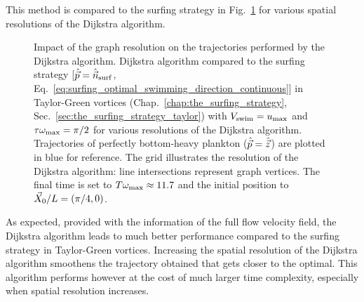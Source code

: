 This method is compared to the surfing strategy in Fig.~\ref{fig:taylor_green_vortex_dijkstra} for various spatial resolutions of the Dijkstra algorithm.
\begin{figure}%
	\centering
	
	\caption[Impact of the graph resolution on the trajectories performed by the Dijkstra algorithm.]{
		Impact of the graph resolution on the trajectories performed by the Dijkstra algorithm.
		Dijkstra algorithm compared to the surfing strategy [$\hat{\vec{p}} = \hat{\vec{n}}_{\mathrm{surf}}$, Eq.~\eqref{eq:surfing_optimal_swimming_direction_continuous}] in Taylor-Green vortices (Chap.~\ref{chap:the_surfing_strategy}, Sec.~\ref{sec:the_surfing_strategy_taylor}) with $V_{\mathrm{swim}} = u_{\max}$ and $\tau \omega_{\max} = \pi/2$ for various resolutions of the Dijkstra algorithm.
		Trajectories of perfectly bottom-heavy plankton ($\hat{\vec{p}} = \hat{\vec{z}}$) are plotted in blue for reference.
		The grid illustrates the resolution of the Dijkstra algorithm: line intersections represent graph vertices.
		The  final time is set to $T \omega_{\max} \approx 11.7$ and the initial position to $\vec{X}_0/L = (\pi/4, 0)$.
	}
	\label{fig:taylor_green_vortex_dijkstra}
\end{figure}
As expected, provided with the information of the full flow velocity field, the Dijkstra algorithm leads to much better performance compared to the surfing strategy in Taylor-Green vortices.
Increasing the spatial resolution of the Dijkstra algorithm smoothens the trajectory obtained that gets closer to the optimal.
This algorithm performs however at the cost of much larger time complexity, especially when spatial resolution increases.

